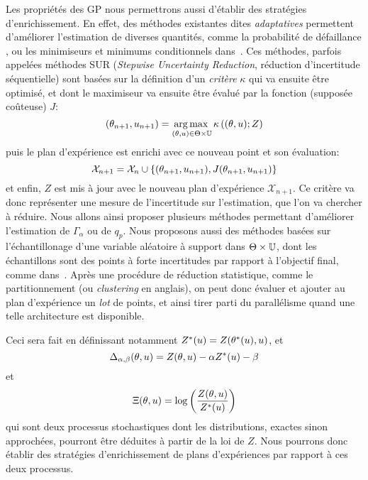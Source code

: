 \documentclass[../../Main_ManuscritThese.tex]{subfiles}
\begin{document}
Les propriétés des GP nous permettrons aussi d'établir des stratégies
d'enrichissement. En effet, des méthodes existantes dites
\emph{adaptatives} permettent d'améliorer l'estimation de diverses
quantités, comme la probabilité de défaillance
\cite{razaaly_rare_2019,moustapha_quantile-based_2016,bect_sequential_2012},
ou les minimiseurs et minimums conditionnels
dans~\cite{ginsbourger_bayesian_2014}. Ces méthodes, parfois appelées
méthodes SUR (\emph{Stepwise Uncertainty Reduction}, réduction
d'incertitude séquentielle) sont basées sur la définition d'un
\emph{critère} $\kappa$ qui va ensuite être optimisé, et dont le
maximiseur va ensuite être évalué par la fonction (supposée coûteuse)
$J$:
\begin{equation*}
  (\theta_{n+1}, u_{n+1}) = \operatorname*{arg\,max \,}_{(\theta,u) \in \Theta\times\mathbb{U}} \kappa\left((\theta, u); Z\right)
\end{equation*}
puis le plan d'expérience est enrichi avec ce nouveau point et son évaluation:
\begin{equation*}
\mathcal{X}_{n+1} = \mathcal{X}_n \cup \{(\theta_{n+1}, u_{n+1}), J(\theta_{n+1}, u_{n+1})\}
\end{equation*}
et enfin, $Z$ est mis à jour avec le nouveau plan d'expérience
$\mathcal{X}_{n+1}$.  Ce critère va donc représenter une mesure de
l'incertitude sur l'estimation, que l'on va chercher à réduire. Nous
allons ainsi proposer plusieurs méthodes permettant d'améliorer
l'estimation de $\Gamma_{\alpha}$ ou de $q_p$.  Nous proposons aussi
des méthodes basées sur l'échantillonage d'une variable aléatoire à
support dans $\Theta\times \mathbb{U}$, dont les échantillons sont des
points à forte incertitudes par rapport à l'objectif final, comme
dans~\cite{echard_ak-mcs_2011,razaaly_rare_2019}. Après une procédure
de réduction statistique, comme le partitionnement (ou
\emph{clustering} en anglais), on peut donc évaluer et ajouter au plan
d'expérience un \emph{lot} de points, et ainsi tirer parti du
parallélisme quand une telle architecture est disponible.

Ceci sera fait en définissant notamment
$Z^*(u) = Z(\theta^*(u),u)$, et
\begin{equation*}
  \Delta_{\alpha,\beta}(\theta, u) = Z(\theta, u) - \alpha Z^*(u) - \beta
\end{equation*}
et
\begin{equation*}
  \Xi(\theta, u) = \log\left(\frac{Z(\theta, u)}{Z^*(u)}\right)
\end{equation*}
qui sont deux processus stochastiques dont les distributions, exactes
sinon approchées, pourront être déduites à partir de la loi de $Z$.
Nous pourrons donc établir des stratégies d'enrichissement de plans
d'expériences par rapport à ces deux processus.
\end{document}
